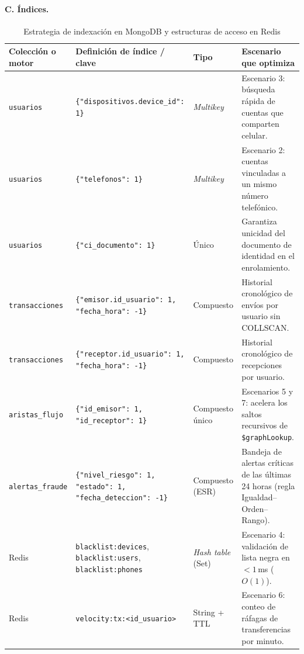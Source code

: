 \documentclass[11pt,a4paper]{article}
\begin{document}
	\paragraph{C. Índices.}
	\begin{table}[H]
		\centering
		\caption{Estrategia de indexación en MongoDB y estructuras de acceso en Redis}
		\label{tab:indices}
		\small
		\begin{tabularx}{\textwidth}{>{\raggedright\arraybackslash}p{2.3cm}>{\raggedright\arraybackslash}p{4.6cm}>{\raggedright\arraybackslash}p{2.1cm}Y}
			\toprule
			\textbf{Colección o motor} & \textbf{Definición de índice / clave} & \textbf{Tipo} & \textbf{Escenario que optimiza} \\
			\midrule
			\texttt{usuarios} & \texttt{\{"dispositivos.device\_id": 1\}} & \textit{Multikey} & Escenario 3: búsqueda rápida de cuentas que comparten celular. \\
			\texttt{usuarios} & \texttt{\{"telefonos": 1\}} & \textit{Multikey} & Escenario 2: cuentas vinculadas a un mismo número telefónico. \\
			\texttt{usuarios} & \texttt{\{"ci\_documento": 1\}} & Único & Garantiza unicidad del documento de identidad en el enrolamiento. \\
			\texttt{transacciones} & \texttt{\{"emisor.id\_usuario": 1, "fecha\_hora": -1\}} & Compuesto & Historial cronológico de envíos por usuario sin COLLSCAN. \\
			\texttt{transacciones} & \texttt{\{"receptor.id\_usuario": 1, "fecha\_hora": -1\}} & Compuesto & Historial cronológico de recepciones por usuario. \\
			\texttt{aristas\_flujo} & \texttt{\{"id\_emisor": 1, "id\_receptor": 1\}} & Compuesto único & Escenarios 5 y 7: acelera los saltos recursivos de \texttt{\$graphLookup}. \\
			\texttt{alertas\_fraude} & \texttt{\{"nivel\_riesgo": 1, "estado": 1, "fecha\_deteccion": -1\}} & Compuesto (ESR) & Bandeja de alertas críticas de las últimas 24 horas (regla Igualdad--Orden--Rango). \\
			Redis & \texttt{blacklist:devices}, \texttt{blacklist:users}, \texttt{blacklist:phones} & \textit{Hash table} (Set) & Escenario 4: validación de lista negra en $<1$\,ms ($O(1)$). \\
			Redis & \texttt{velocity:tx:}\allowbreak\texttt{<id\_usuario>} & String + TTL & Escenario 6: conteo de ráfagas de transferencias por minuto. \\
			\bottomrule
		\end{tabularx}
	\end{table}
	
\end{document}
